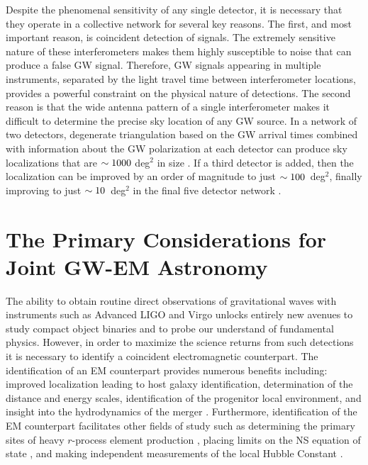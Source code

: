 Despite the phenomenal sensitivity of any single detector, it is necessary that they operate in a collective network for several key reasons. The first, and most important reason, is coincident detection of signals. The extremely sensitive nature of these interferometers makes them highly susceptible to noise that can produce a false GW signal. Therefore, GW signals appearing in multiple instruments, separated by the light travel time between interferometer locations, provides a powerful constraint on the physical nature of detections. The second reason is that the wide antenna pattern of a single interferometer makes it difficult to determine the precise sky location of any GW source. In a network of two detectors, degenerate triangulation based on the GW arrival times combined with information about the GW polarization at each detector can produce sky localizations that are $\sim1000$ deg$^2$ in size \citep[see e.g.,][]{LIGOLocalization,ChenHolz16}. If a third detector is added, then the localization can be improved by an order of magnitude to just $\sim100$~deg$^2$, finally improving to just $\sim10$~deg$^2$ in the final five detector network \citep[see e.g.,][]{LIGOLocalization,ChenHolz16}.

\section{The Primary Considerations for Joint GW-EM Astronomy}
\label{sec:intro_joint}
The ability to obtain routine direct observations of gravitational waves with instruments such as Advanced LIGO and Virgo unlocks entirely new avenues to study compact object binaries and to probe our understand of fundamental physics. However, in order to maximize the science returns from such detections it is necessary to identify a coincident electromagnetic counterpart. The identification of an EM counterpart provides numerous benefits including: improved localization leading to host galaxy identification, determination of the distance and energy scales, identification of the progenitor local environment, and insight into the hydrodynamics of the merger \citep[see e.g.,][]{Sylvestre2003,Stubbs2008,Phinney2010,Stamatikos+09, Fong+10,MetzgerBerger12,Fong+13,FongBerger13,Fong+15}. Furthermore, identification of the EM counterpart facilitates other fields of study such as determining the primary sites of heavy $r$-process element production \citep{Rosswog+14,vandeVoort+15,Kasen+17}, placing limits on the NS equation of state \citep[see e.g.,][]{Hotokezaka+11,Kawaguchi+15,Radice+18}, and making independent measurements of the local Hubble Constant \citep[H$_0$; see e.g.,][]{Schutz1986,HolzHughes05,DelPozzo2012, LIGOH0,Guidorzi+17}.

